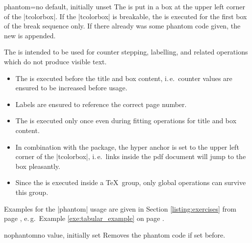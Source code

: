 \begin{docTcbKey}{phantom}{=}{no default, initially unset}
The  is put in a box at the upper left corner of the |tcolorbox|.
If the |tcolorbox| is breakable, the  is executed for the first box of
the break sequence only. If there already was some phantom code given, the
new  is appended.\par
The  is intended to be used for counter stepping, labelling, and
related operations which do not produce visible text.
\begin{itemize}
\item The  is executed before the title and box content, i.\,e.\ counter
  values are ensured to be increased before usage.
\item Labels are ensured to reference the correct page number.
\item The  is executed only once even during fitting operations for
  title and box content.
\item In combination with the  package, the hyper anchor is set
  to the upper left corner of the |tcolorbox|, i.\,e.\ links inside the pdf document
  will jump to the box pleasantly.
\item Since the  is executed inside a \TeX\ group, only global
  operations can survive this group.
\end{itemize}
Examples for the |phantom| usage are given in Section \ref{listing:exercises}
from page \pageref{listing:exercises}, e.\,g.\
Example \ref{exe:tabular_example} on page \pageref{exe:tabular_example}.
\end{docTcbKey}

\begin{docTcbKey}{nophantom}{}{no value, initially set}
Removes the phantom code if set before.
\end{docTcbKey}




